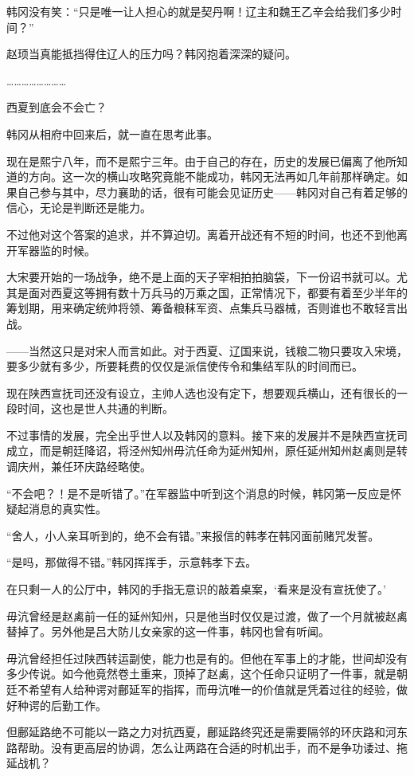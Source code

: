韩冈没有笑：“只是唯一让人担心的就是契丹啊！辽主和魏王乙辛会给我们多少时间？”

赵顼当真能抵挡得住辽人的压力吗？韩冈抱着深深的疑问。

……………………

西夏到底会不会亡？

韩冈从相府中回来后，就一直在思考此事。

现在是熙宁八年，而不是熙宁三年。由于自己的存在，历史的发展已偏离了他所知道的方向。这一次的横山攻略究竟能不能成功，韩冈无法再如几年前那样确定。如果自己参与其中，尽力襄助的话，很有可能会见证历史——韩冈对自己有着足够的信心，无论是判断还是能力。

不过他对这个答案的追求，并不算迫切。离着开战还有不短的时间，也还不到他离开军器监的时候。

大宋要开始的一场战争，绝不是上面的天子宰相拍拍脑袋，下一份诏书就可以。尤其是面对西夏这等拥有数十万兵马的万乘之国，正常情况下，都要有着至少半年的筹划期，用来确定统帅将领、筹备粮秣军资、点集兵马器械，否则谁也不敢轻言出战。

——当然这只是对宋人而言如此。对于西夏、辽国来说，钱粮二物只要攻入宋境，要多少就有多少，所要耗费的仅仅是派信使传令和集结军队的时间而已。

现在陕西宣抚司还没有设立，主帅人选也没有定下，想要观兵横山，还有很长的一段时间，这也是世人共通的判断。

不过事情的发展，完全出乎世人以及韩冈的意料。接下来的发展并不是陕西宣抚司成立，而是朝廷降诏，将泾州知州毋沆任命为延州知州，原任延州知州赵禼则是转调庆州，兼任环庆路经略使。

“不会吧？！是不是听错了。”在军器监中听到这个消息的时候，韩冈第一反应是怀疑起消息的真实性。

“舍人，小人亲耳听到的，绝不会有错。”来报信的韩孝在韩冈面前赌咒发誓。

“是吗，那做得不错。”韩冈挥挥手，示意韩孝下去。

在只剩一人的公厅中，韩冈的手指无意识的敲着桌案，‘看来是没有宣抚使了。’

毋沆曾经是赵禼前一任的延州知州，只是他当时仅仅是过渡，做了一个月就被赵禼替掉了。另外他是吕大防儿女亲家的这一件事，韩冈也曾有听闻。

毋沆曾经担任过陕西转运副使，能力也是有的。但他在军事上的才能，世间却没有多少传说。如今他竟然卷土重来，顶掉了赵禼，这个任命只证明了一件事，就是朝廷不希望有人给种谔对鄜延军的指挥，而毋沆唯一的价值就是凭着过往的经验，做好种谔的后勤工作。

但鄜延路绝不可能以一路之力对抗西夏，鄜延路终究还是需要隔邻的环庆路和河东路帮助。没有更高层的协调，怎么让两路在合适的时机出手，而不是争功诿过、拖延战机？

